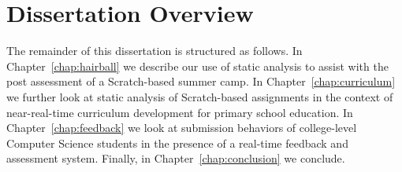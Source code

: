 \section{Dissertation Overview}
The remainder of this dissertation is structured as follows. In
Chapter~\ref{chap:hairball} we describe our use of static analysis to assist
with the post assessment of a Scratch-based summer camp. In
Chapter~\ref{chap:curriculum} we further look at static analysis of
Scratch-based assignments in the context of near-real-time curriculum
development for primary school education. In Chapter~\ref{chap:feedback} we
look at submission behaviors of college-level Computer Science students in the
presence of a real-time feedback and assessment system. Finally, in
Chapter~\ref{chap:conclusion} we conclude.
